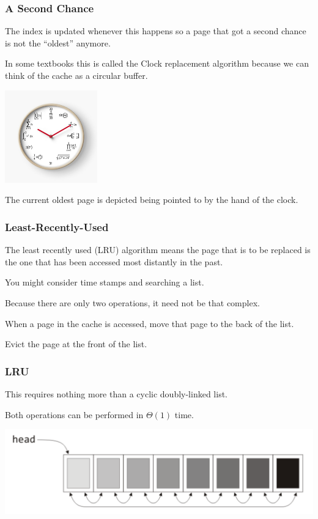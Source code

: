 \begin{frame}
\frametitle{A Second Chance}

The index is updated whenever this happens so a page that got a second chance is not the ``oldest'' anymore. 

In some textbooks this is called the Clock replacement algorithm because we can think of the cache as a circular buffer.

\begin{center}
	\includegraphics[width=0.3\textwidth]{images/mathclock.jpg}
\end{center}

The current oldest page is depicted being pointed to by the hand of the clock.

\end{frame}

\begin{frame}
\frametitle{Least-Recently-Used}

The least recently used (LRU) algorithm means the page that is to be replaced is the one that has been accessed most distantly in the past. 

You might consider time stamps and searching a list.

Because there are only two operations, it need not be that complex. 

When a page in the cache is accessed, move that page to the back of the list.

Evict the page at the front of the list.

\end{frame}

\begin{frame}
\frametitle{LRU}

This requires nothing more than a cyclic doubly-linked list. 

Both operations can be performed in $\Theta(1)$ time.

\begin{center}
\includegraphics[width=\textwidth]{images/lru-linkedlist.png}
\end{center}


\end{frame}


